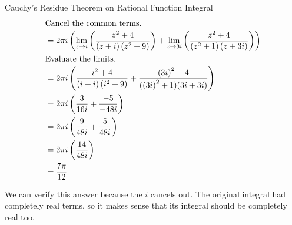 \begin{example}{Cauchy's Residue Theorem on Rational Function Integral}
\begin{align*}
    \shortintertext{Cancel the common terms.}
                                                                                                &= 2 \pi i \left( \lim\limits_{z \to i} \left( \frac{z^{2} + 4}{(z+i) \left( z^{2} + 9 \right)} \right) + \lim\limits_{z \to 3i} \left( \frac{z^{2} + 4}{\left( z^{2} + 1 \right) (z + 3i)} \right) \right) \\
    \shortintertext{Evaluate the limits.}
                                                                                                &= 2 \pi i \left( \frac{i^{2} + 4}{(i+i) \left( i^{2} + 9 \right)} + \frac{{(3i)}^{2} + 4}{({(3i)}^{2} + 1) (3i + 3i)} \right) \\
                                                                                                &= 2 \pi i \left( \frac{3}{16i} + \frac{-5}{-48i} \right) \\
                                                                                                &= 2 \pi i \left( \frac{9}{48i} + \frac{5}{48i} \right) \\
                                                                                                &= 2 \pi i \left( \frac{14}{48i} \right) \\
                                                                                                &= \frac{7 \pi}{12}
  \end{align*}

  We can verify this answer because the $i$ cancels out.
  The original integral had completely real terms, so it makes sense that its integral should be completely real too.
\end{example}

